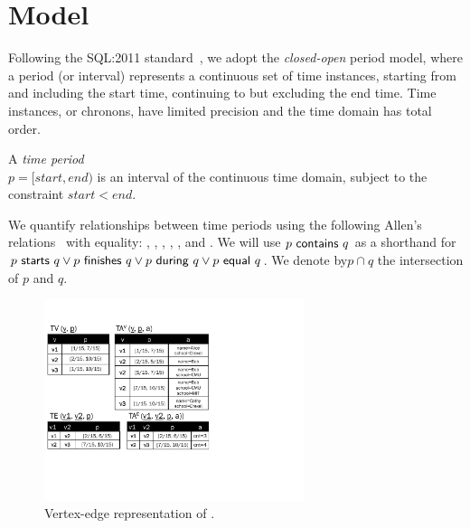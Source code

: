 \section{Model}
\label{sec:model}


Following the SQL:2011
standard~\cite{DBLP:journals/sigmod/KulkarniM12}, we adopt the {\em
  closed-open} period model, where a period (or interval) represents a
continuous set of time instances, starting from and including the
start time, continuing to but excluding the end time.  Time instances,
or chronons, have limited precision and the time domain has total
order.

\vspace{-0.2cm}
\begin{definition}
A {\em time period} \\$p = [start, end)$ is an interval of the
  continuous time domain, subject to the constraint $start < end$.
\label{def:period} 
\vspace{-0.2cm}
\end{definition}

We quantify relationships between time periods using
the following Allen's relations~\cite{allen83} with equality:
, , ,
, , and .  We
will use $\pred{p}{contains}{q}$ as a shorthand for
$\pred{p}{starts}{q} \vee \pred{p}{finishes}{q} \vee
\pred{p}{during}{q} \vee \pred{p}{equal}{q}$.
We denote by$p \cap q$ the intersection of $p$ and $q$. \eat{$$to denote $[\predName{max}(p.start,q.start),
  \predName{min}(p.end, q.end))$.}

\begin{figure}[t!]
\centering
\includegraphics[width=3in]{figs/T1_rel.pdf}
\vspace{-0.2cm}
\caption{Vertex-edge representation of \tg {}.}
\vspace{-0.3cm}
\label{fig:tg_ve}
\end{figure}

